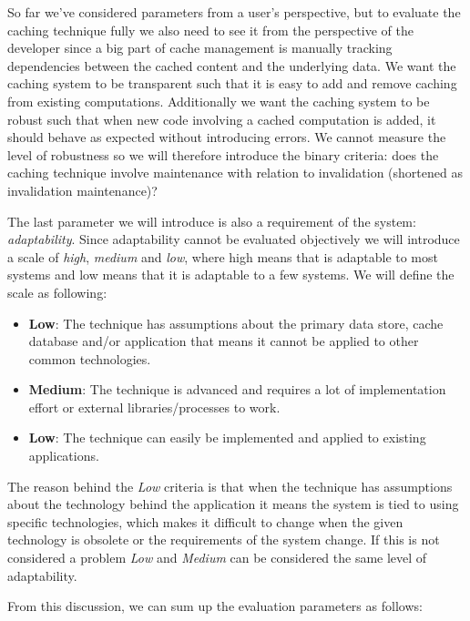 
So far we've considered parameters from a user's perspective, but to evaluate the caching technique fully we also need to see it from the perspective of the developer since a big part of cache management is manually tracking dependencies between the cached content and the underlying data. We want the caching system to be transparent such that it is easy to add and remove caching from existing computations. Additionally we want the caching system to be robust such that when new code involving a cached computation is added, it should behave as expected without introducing errors. We cannot measure the level of robustness so we will therefore introduce the binary criteria: does the caching technique involve maintenance with relation to invalidation (shortened as invalidation maintenance)?


The last parameter we will introduce is also a requirement of the system: \emph{adaptability}. Since adaptability cannot be evaluated objectively we will introduce a scale of \emph{high}, \emph{medium} and \emph{low}, where high means that is adaptable to most systems and low means that it is adaptable to a few systems. We will define the scale as following:

\begin{itemize}
  \item \textbf{Low}: The technique has assumptions about the primary data store, cache database and/or application that means it cannot be applied to other common technologies.
  \item \textbf{Medium}: The technique is advanced and requires a lot of implementation effort or external libraries/processes to work.
  \item \textbf{Low}: The technique can easily be implemented and applied to existing applications.
\end{itemize}

The reason behind the \emph{Low} criteria is that when the technique has assumptions about the technology behind the application it means the system is tied to using specific technologies, which makes it difficult to change when the given technology is obsolete or the requirements of the system change. If this is not considered a problem \emph{Low} and \emph{Medium} can be considered the same level of adaptability.

From this discussion, we can sum up the evaluation parameters as follows:

